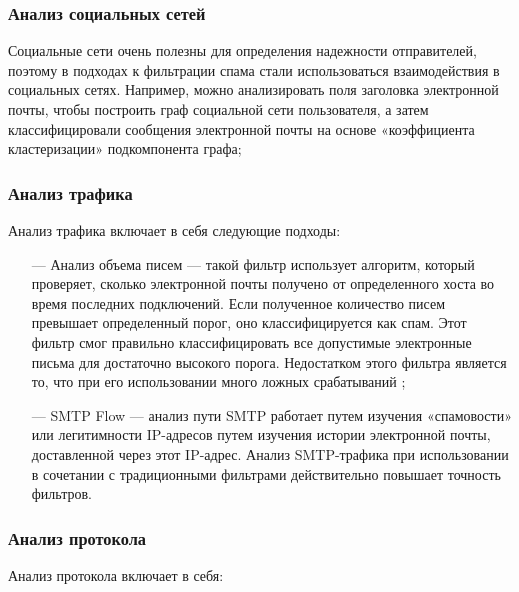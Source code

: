 \subsubsection{Анализ социальных сетей}
Социальные сети очень полезны для определения
надежности отправителей, поэтому в подходах к фильтрации спама стали использоваться
взаимодействия в социальных сетях. Например, можно анализировать поля заголовка
электронной почты, чтобы построить граф социальной сети пользователя, а затем классифицировали
сообщения электронной почты на основе «коэффициента кластеризации» подкомпонента графа;

\subsubsection{Анализ трафика}

Анализ трафика включает в себя следующие подходы:

\begin{itemize}
    \item[—] Анализ объема писем — такой фильтр использует алгоритм, который проверяет,
        сколько электронной почты получено от определенного хоста во время последних
        подключений. Если полученное количество писем превышает определенный порог,
        оно классифицируется как спам. Этот фильтр смог правильно классифицировать
        все допустимые электронные письма для достаточно высокого порога. Недостатком
        этого фильтра является то, что при его использовании много ложных срабатываний \cite{IFIP};
    \item[—] SMTP Flow — анализ пути SMTP работает путем изучения «спамовости» или легитимности
        IP-адресов путем изучения истории электронной почты, доставленной через этот IP-адрес.
        Анализ SMTP-трафика при использовании в сочетании с традиционными фильтрами
        действительно повышает точность фильтров.
\end{itemize}

\subsubsection{Анализ протокола}

Анализ протокола включает в себя:

